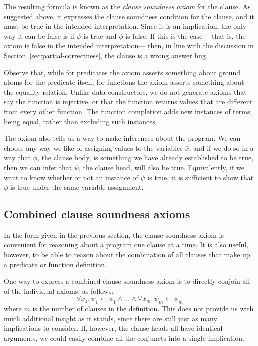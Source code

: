 The resulting formula is known as
the \emph{clause soundness axiom}
for the clause.
As suggested above,
it expresses the clause soundness condition for the clause,
and it must be true in the intended interpretation.
Since it is an implication,
the only way it can be false
is if $\psi$ is true and $\phi$ is false.
If this is the case---%
that is, the axiom is false in the intended interpretation---%
then, in line with the discussion in Section~\ref{sec:partial-correctness},
the clause is a wrong answer bug.

Observe that,
while for predicates the axiom asserts
something about ground atoms for the predicate itself,
for functions the axiom asserts
something about the equality relation.
Unlike data constructors,
we do not generate axioms that say
the function is injective,
or that the function returns values
that are different from every other function.
The function completion adds new instances of terms being equal,
rather than excluding such instances.

The axiom also tells us a way to make inferences about the program.
We can choose any way we like
of assigning values to the variables $\bar{x}$,
and if we do so in a way that $\phi$, the clause body,
is something we have already established to be true,
then we can infer that $\psi$, the clause head,
will also be true.
Equivalently,
if we want to know whether or not an instance of $\psi$ is true,
it is sufficient to show that $\phi$ is true
under the same variable assignment.


\subsection{Combined clause soundness axioms}
\label{sec:ax-combined}

In the form given in the previous section,
the clause soundness axiom is convenient
for reasoning about a program one clause at a time.
It is also useful, however,
to be able to reason about the combination of all clauses
that make up a predicate or function definition.

One way to express a combined clause soundness axiom
is to directly conjoin all of the individual axioms,
as follows:
\[
    \forall \bar{x}_1.\, \psi_1 \leftarrow \phi_1
    \land \ldots \land
    \forall \bar{x}_m.\, \psi_m \leftarrow \phi_m
\]
where $m$ is the number of clauses in the definition.
This does not provide us with much additional insight as it stands,
since there are still just as many implications to consider.
If, however,
the clause heads all have identical arguments,
we could easily combine all the conjuncts
into a single implication.

